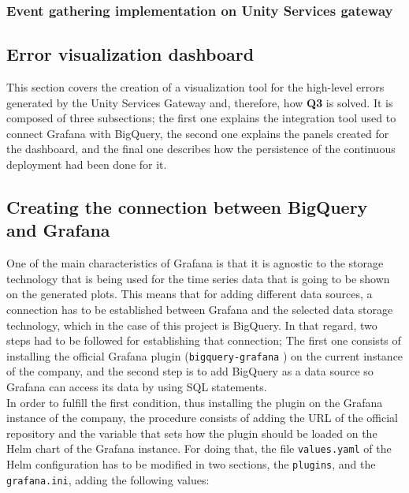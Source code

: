 \documentclass[english, 12pt, a4paper, sci, utf8, a-1b, online]{aaltothesis}
\begin{document}
\subsubsection{Event gathering implementation on Unity Services gateway}

\subsection{Error visualization dashboard}



This section covers the creation of a visualization tool for the high-level errors generated by the Unity Services Gateway and, therefore, how \textbf{Q3} is solved. It is composed of three subsections; the first one explains the integration tool used to connect Grafana with BigQuery, the second one explains the panels created for the dashboard, and the final one describes how the persistence of the continuous deployment had been done for it.

\subsection{Creating the connection between BigQuery and Grafana}

One of the main characteristics of Grafana is that it is agnostic to the storage technology that is being used for the time series data that is going to be shown on the generated plots. This means that for adding different data sources, a connection has to be established between Grafana and the selected data storage technology, which in the case of this project is BigQuery. In that regard, two steps had to be followed for establishing that connection; The first one consists of installing the official Grafana plugin (\texttt{bigquery-grafana} \cite{GrafanaPlugin}) on the current instance of the company, and the second step is to add BigQuery as a data source so Grafana can access its data by using SQL statements.\\

In order to fulfill the first condition, thus installing the plugin on the Grafana instance of the company, the procedure consists of adding the URL of the official repository and the variable that sets how the plugin should be loaded on the Helm chart of the Grafana instance. For doing that, the file \texttt{values.yaml} of the Helm configuration has to be modified in two sections, the \texttt{plugins}, and the \texttt{grafana.ini}, adding the following values:\\
\end{document}
